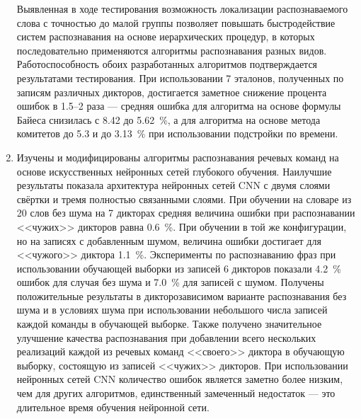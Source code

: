\begin{enumerate}[label={\arabic*)}]
	Выявленная в ходе тестирования возможность локализации распознаваемого слова с точностью до малой группы позволяет повышать быстродействие систем распознавания на основе иерархических процедур, в которых последовательно применяются алгоритмы распознавания разных видов.
	Работоспособность обоих разработанных алгоритмов подтверждается результатами тестирования.
	При использовании 7 эталонов, полученных по записям различных дикторов, достигается заметное снижение процента ошибок в 1.5--2 раза --- средняя ошибка для алгоритма на основе формулы Байеса снизилась с 8.42 до 5.62~\%, а для алгоритма на основе метода комитетов до 5.3 и до 3.13~\% при использовании подстройки по времени.
	\item Изучены и модифицированы алгоритмы распознавания речевых команд на основе искусственных нейронных сетей глубокого обучения.
	Наилучшие результаты показала архитектура нейронных сетей CNN с двумя слоями свёртки и тремя полностью связанными слоями.
	При обучении на словаре из 20 слов без шума на 7 дикторах средняя величина ошибки при распознавании <<чужих>> дикторов равна 0.6~\%.
	При обучении в той же конфигурации, но на записях с добавленным шумом, величина ошибки достигает для <<чужого>> диктора 1.1~\%.
	Эксперименты по распознаванию фраз при использовании обучающей выборки из записей 6 дикторов показали 4.2~\% ошибок для случая без шума и 7.0~\% для записей с шумом.
	Получены положительные результаты в дикторозависимом варианте распознавания без шума и в условиях шума при использовании небольшого числа записей каждой команды в обучающей выборке.
	Также получено значительное улучшение качества распознавания при добавлении всего нескольких реализаций каждой из речевых команд <<своего>> диктора в обучающую выборку, состоящую из записей <<чужих>> дикторов.
	При использовании нейронных сетей CNN количество ошибок является заметно более низким, чем для других алгоритмов, единственный замеченный недостаток --- это длительное время обучения нейронной сети.
\end{enumerate}
